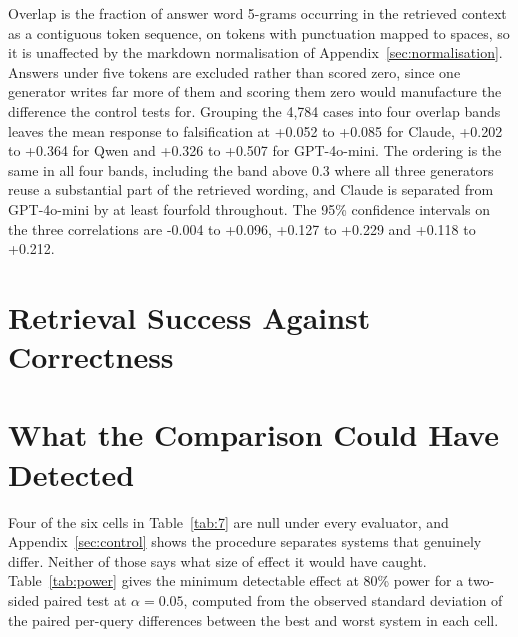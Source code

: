 \documentclass[11pt]{article}
\begin{document}
Overlap is the fraction of answer word 5-grams occurring in the retrieved context as a contiguous token sequence, on tokens with punctuation mapped to spaces, so it is unaffected by the markdown normalisation of Appendix~\ref{sec:normalisation}. Answers under five tokens are excluded rather than scored zero, since one generator writes far more of them and scoring them zero would manufacture the difference the control tests for. Grouping the 4,784 cases into four overlap bands leaves the mean response to falsification at +0.052 to +0.085 for Claude, +0.202 to +0.364 for Qwen and +0.326 to +0.507 for GPT-4o-mini. The ordering is the same in all four bands, including the band above 0.3 where all three generators reuse a substantial part of the retrieved wording, and Claude is separated from GPT-4o-mini by at least fourfold throughout. The 95\% confidence intervals on the three correlations are -0.004 to +0.096, +0.127 to +0.229 and +0.118 to +0.212.

\section{Retrieval Success Against Correctness}
\label{app:cell}

\begin{table}[t]
\centering
{}
\caption{Correctness from graded judgement. The raw cell is 17\% to 36\% of queries; the share that is a grounded, committed, wrong answer is 4.5\% to 7.9\%.}
\label{tab:6}
\end{table}


\section{What the Comparison Could Have Detected}
\label{app:power}

Four of the six cells in Table~\ref{tab:7} are null under every evaluator, and Appendix~\ref{sec:control} shows the procedure separates systems that genuinely differ. Neither of those says what size of effect it would have caught. Table~\ref{tab:power} gives the minimum detectable effect at 80\% power for a two-sided paired test at $\alpha = 0.05$, computed from the observed standard deviation of the paired per-query differences between the best and worst system in each cell.
\end{document}
